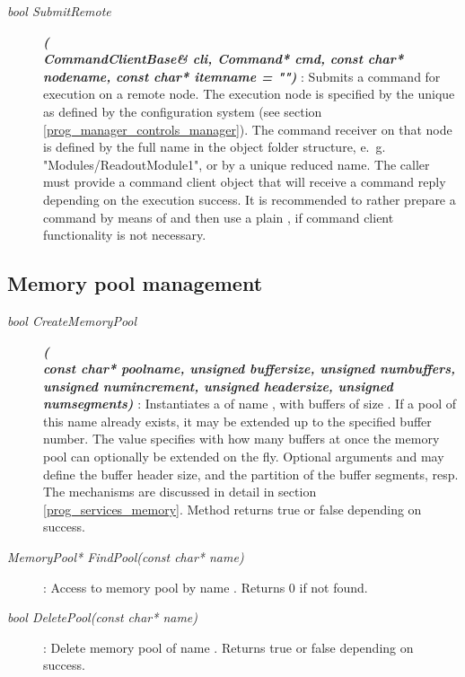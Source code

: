 \begin{description}
\item[\em bool SubmitRemote] {\small \bf\em (} \\
{\small \bf\em CommandClientBase\& cli, Command* cmd, const char* nodename, const char* itemname = "") }:
Submits a command  for execution on a remote node. 
The execution node is specified by the unique  as defined
by the configuration system (see section \ref{prog_manager_controls_manager}).
The command receiver on that node
is defined by the full name  in the object folder structure,
e.~g.~ "Modules/ReadoutModule1", or by a unique reduced name. 
The caller must provide a command client object
 that will receive a command reply depending on the execution success.
It is recommended to rather prepare a command by means of  
and then use a  plain , if command client functionality
is not necessary.


\end{description}
 
\subsection{Memory pool management}	 	   

\begin{description}	

\item[\em bool CreateMemoryPool] {\small \bf\em (} \\
{\small \bf\em const char* poolname, unsigned buffersize, unsigned numbuffers, \\
          unsigned numincrement, unsigned headersize, unsigned numsegments)} : 
Instantiates a  of name , 
with  buffers of size .
If a pool of this name already exists, it may be extended 
up to the specified buffer number.
The  value specifies with how many buffers at once the memory pool 
can optionally be extended on the fly.
Optional arguments  and  may
define the buffer header size, and the partition of the buffer segments, resp.         
The  mechanisms are discussed in detail in 
section \ref{prog_services_memory}.
Method returns true or false depending on success.	

\item[\em MemoryPool* FindPool\small (const char* name)] :
Access to memory pool by name . Returns 0 if not found.

\item[\em bool DeletePool\small (const char* name)] :
Delete memory pool of name . Returns true or false depending on success.
   
\end{description}
	 

